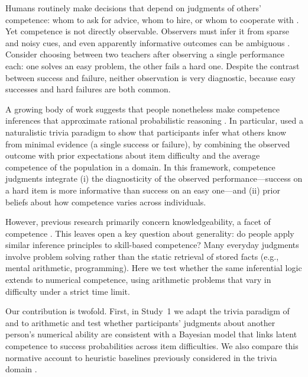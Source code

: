 \documentclass[10pt,letterpaper]{article}
\begin{document}
Humans routinely make decisions that depend on judgments of others’ competence: whom to ask for advice, whom to hire, or whom to cooperate with \citep{Harris-2018,Cuddy-2011,Xiang-2023}. Yet competence is not directly observable. Observers must infer it from sparse and noisy cues, and even apparently informative outcomes can be ambiguous \citep{Jones-1989}. Consider choosing between two teachers after observing a single performance each: one solves an easy problem, the other fails a hard one. Despite the contrast between success and failure, neither observation is very diagnostic, because easy successes and hard failures are both common.

A growing body of work suggests that people nonetheless make competence inferences that approximate rational probabilistic reasoning \citep{Baker-2017,Davis-2025,Jara-Ettinger-2017,Xiang-2026,Jansen-2021,Aboody-2025}. In particular, \citet{Mercier-2025c} used a naturalistic trivia paradigm to show that participants infer what others know from minimal evidence (a single success or failure), by combining the observed outcome with prior expectations about item difficulty and the average competence of the population in a domain. In this framework, competence judgments integrate (i) the diagnosticity of the observed performance—success on a hard item is more informative than success on an easy one—and (ii) prior beliefs about how competence varies across individuals.

However, previous research primarily concern knowledgeability, a facet of competence \citep{Aboody-2025,Dubourg-2025,Mercier-2025c}. This leaves open a key question about generality: do people apply similar inference principles to skill-based competence? Many everyday judgments involve problem solving rather than the static retrieval of stored facts (e.g., mental arithmetic, programming). Here we test whether the same inferential logic extends to numerical competence, using arithmetic problems that vary in difficulty under a strict time limit.

Our contribution is twofold. First, in Study~1 we adapt the trivia paradigm of \citet{Mercier-2025c} and \citet{Dubourg-2025} to arithmetic and test whether participants’ judgments about another person’s numerical ability are consistent with a Bayesian model that links latent competence to success probabilities across item difficulties. We also compare this normative account to heuristic baselines previously considered in the trivia domain \citep{Mercier-2025c}. 
\end{document}
